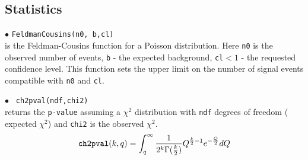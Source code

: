 \documentclass[12pt,a4paper]{article}
\begin{document}
\subsection{Statistics}
\noindent$\bullet$ \verb|FeldmanCousins(n0, b,cl)|\\
is the Feldman-Cousins \cite{Feldman:1997qc}  function for a Poisson distribution.
Here {\tt n0} is the observed number of events, {\tt b} -  the expected background,
\verb|cl|$ < 1 $ - the requested confidence level. This function sets the upper limit on the number 
of signal events compatible with {\tt n0}  and {\tt cl}.

\noindent$\bullet$ \verb| ch2pval(ndf,chi2)|\\ 
returns the {\tt p-value} assuming a $\chi^2$ distribution with  {\tt ndf} degrees
of freedom ( expected  $\chi^2$) and {\tt chi2} is the observed $\chi^2$.  
$$   
{  \verb|ch2pval|(k,q)=\int_q^\infty  \frac{1}{2^k \Gamma(\frac{k}{2})} Q^{\frac{k}{2}-1}
e^{-\frac{Q}{2}} dQ } $$   





\appendix
\end{document}
